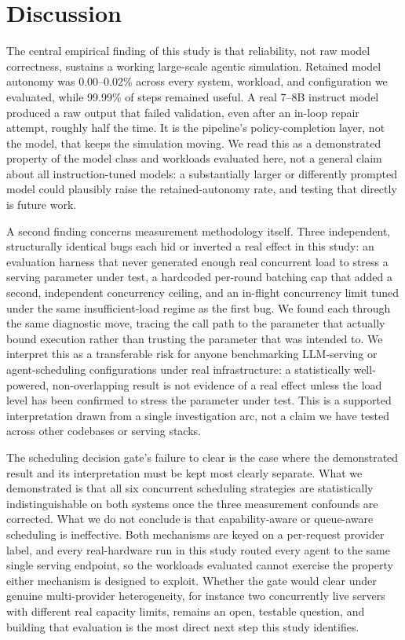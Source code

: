 \section{Discussion}
\label{sec:discussion}

The central empirical finding of this study is that reliability, not raw model correctness, sustains a working large-scale agentic simulation. Retained model autonomy was 0.00--0.02\% across every system, workload, and configuration we evaluated, while 99.99\% of steps remained useful. A real 7--8B instruct model produced a raw output that failed validation, even after an in-loop repair attempt, roughly half the time. It is the pipeline's policy-completion layer, not the model, that keeps the simulation moving. We read this as a demonstrated property of the model class and workloads evaluated here, not a general claim about all instruction-tuned models: a substantially larger or differently prompted model could plausibly raise the retained-autonomy rate, and testing that directly is future work.

A second finding concerns measurement methodology itself. Three independent, structurally identical bugs each hid or inverted a real effect in this study: an evaluation harness that never generated enough real concurrent load to stress a serving parameter under test, a hardcoded per-round batching cap that added a second, independent concurrency ceiling, and an in-flight concurrency limit tuned under the same insufficient-load regime as the first bug. We found each through the same diagnostic move, tracing the call path to the parameter that actually bound execution rather than trusting the parameter that was intended to. We interpret this as a transferable risk for anyone benchmarking LLM-serving or agent-scheduling configurations under real infrastructure: a statistically well-powered, non-overlapping result is not evidence of a real effect unless the load level has been confirmed to stress the parameter under test. This is a supported interpretation drawn from a single investigation arc, not a claim we have tested across other codebases or serving stacks.

The scheduling decision gate's failure to clear is the case where the demonstrated result and its interpretation must be kept most clearly separate. What we demonstrated is that all six concurrent scheduling strategies are statistically indistinguishable on both systems once the three measurement confounds are corrected. What we do not conclude is that capability-aware or queue-aware scheduling is ineffective. Both mechanisms are keyed on a per-request provider label, and every real-hardware run in this study routed every agent to the same single serving endpoint, so the workloads evaluated cannot exercise the property either mechanism is designed to exploit. Whether the gate would clear under genuine multi-provider heterogeneity, for instance two concurrently live servers with different real capacity limits, remains an open, testable question, and building that evaluation is the most direct next step this study identifies.

